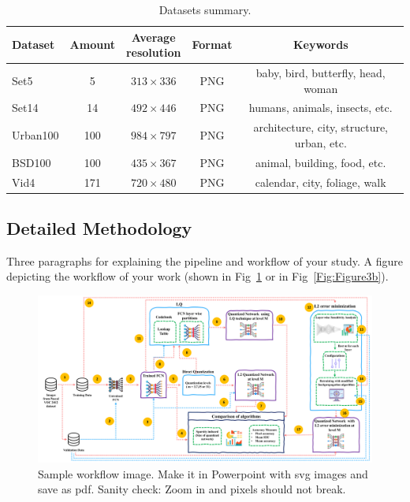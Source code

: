 \documentclass[conference]{IEEEtran}
\begin{document}
\begin{table}[!htb]
    \centering
    \caption{Datasets summary.}
    \label{tab:datasets}
	\begin{tabular}{|l|c|c|c|c|}
	\hline
	Dataset  & Amount & \makecell{Average\\resolution} & Format & Keywords  \\ \hline
	Set5     & 5      & $313 \times 336$   & PNG    & baby, bird, butterfly, head, woman \\ \hline
	Set14    & 14     & $492 \times 446$   & PNG    & humans, animals, insects, etc. \\ \hline
	Urban100 & 100    & $984 \times 797$   & PNG    & architecture, city, structure, urban, etc. \\ \hline
	BSD100   & 100    & $435 \times 367$   & PNG    & animal, building, food, etc. \\ \hline
	Vid4     & 171    & $720 \times 480$   & PNG    &  calendar, city, foliage, walk \\ \hline
\end{tabular}
\end{table}

\subsection{Detailed Methodology}
Three paragraphs for explaining the pipeline and workflow of your study.
A figure depicting the workflow of your work (shown in Fig~\ref{Fig:Figure1} or in Fig~\ref{Fig:Figure3b}).

\begin{figure}[htbp]
\centerline{\includegraphics[width=17.8cm]{Figure1.pdf}}
\caption{Sample workflow image. Make it in Powerpoint with svg images and save as pdf. Sanity check: Zoom in and pixels should not break.}
\label{Fig:Figure1}
\end{figure}
\end{document}
